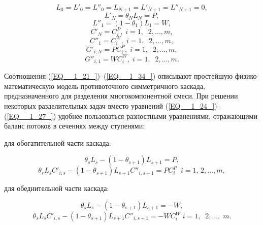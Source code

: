 \begin{equation} \label{EQ__1_28_} 
  L_{0} =L'_{0} =L''_{0} =L_{N+1} =L'_{N+1} =L''_{N+1} =0, 
  \end{equation} 
  \begin{equation} \label{EQ__1_29_} 
  L'_{N} =\theta _{N} L_{N} =P,        
  \end{equation} 
  \begin{equation} \label{EQ__1_30_} 
  L''_{1} =(1-\theta _{1} )L_{1} =W,        
  \end{equation} 
  \begin{equation} \label{EQ__1_31_} 
  C'_{N} =C_{i}^{P} ,\; i=1,\; \; 2,...,m, 
  \end{equation} 
  \begin{equation} \label{EQ__1_32_} 
  C''_{1} =C_{i}^{W} ,\; i=1,\; \; 2,...,m, 
  \end{equation} 
  \begin{equation} \label{EQ__1_33_} 
  G'_{i,N} =PC_{i}^{P} ,\; i=1,\; \; 2,...,m, 
  \end{equation} 
  \begin{equation} \label{EQ__1_34_} 
  G''_{i,1} =WC_{i}^{W} ,\; i=1,\; \; 2,...,m. 
\end{equation} 

Соотношения (\ref{EQ__1_21_})--(\ref{EQ__1_34_}) описывают простейшую физико-математическую модель противоточного симметричного каскада, предназначенного для разделения многокомпонентной смеси. При решении некоторых разделительных задач вместо уравнений (\ref{EQ__1_24_})--(\ref{EQ__1_27_}) удобнее пользоваться разностными уравнениями, отражающими баланс потоков в сечениях между ступенями:

для обогатительной части каскада:

\begin{equation} \label{EQ__1_35_} 
  \theta _{s} L_{s} -(1-\theta _{s+1} )L_{s+1} =P, 
  \end{equation} 
  \begin{equation} \label{EQ__1_36_} 
  \theta _{s} L_{s} C'_{i,s} -(1-\theta _{s+1} )L_{s+1} C''_{i,s+1} =PC_{i}^{P} \; \; i=1,\, 2,...,m,        
  \end{equation} 

для обеднительной части каскада:

\begin{equation} \label{EQ__1_37_} 
  \theta _{s} L_{s} -(1-\theta _{s+1} )L_{s+1} =-W, 
  \end{equation} 
  \begin{equation} \label{EQ__1_38_} 
  \theta _{s} L_{s} C'_{i,s} -(1-\theta _{s+1} )L_{s+1} C''_{i,s+1} =-WC_{i}^{W} \; i=1,\; \; 2,...,\; m.        
  \end{equation} 

